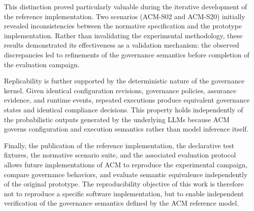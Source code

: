 \documentclass[10pt]{article}
\begin{document}
This distinction proved particularly valuable during the iterative development
of the reference implementation. Two scenarios (ACM-S02 and ACM-S20) initially
revealed inconsistencies between the normative specification and the prototype
implementation. Rather than invalidating the experimental methodology, these
results demonstrated its effectiveness as a validation mechanism: the observed
discrepancies led to refinements of the governance semantics before completion
of the evaluation campaign.

Replicability is further supported by the deterministic nature of the
governance kernel. Given identical configuration revisions, governance
policies, assurance evidence, and runtime events, repeated executions produce
equivalent governance states and identical compliance decisions. This property
holds independently of the probabilistic outputs generated by the underlying
LLMs because ACM governs configuration and execution semantics rather than
model inference itself.

Finally, the publication of the reference implementation, the declarative test
fixtures, the normative scenario suite, and the associated evaluation protocol
allows future implementations of ACM to reproduce the experimental campaign,
compare governance behaviors, and evaluate semantic equivalence independently
of the original prototype. The reproducibility objective of this work is
therefore not to reproduce a specific software implementation, but to enable
independent verification of the governance semantics defined by the ACM
reference model.
\end{document}
